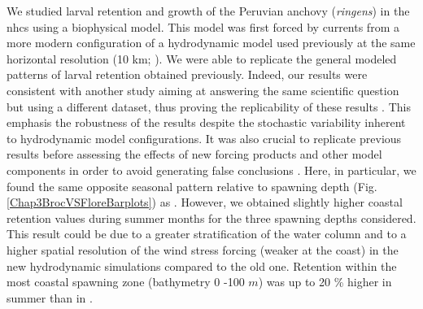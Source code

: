 We studied larval retention and growth of the Peruvian anchovy (\textit{\gls{ringens}}) in the \acrshort{nhcs} using a biophysical model. This model was first forced by currents from a more modern configuration of a hydrodynamic model used previously at the same horizontal resolution (10 km; \cite{BrocLett2008}). We were able to replicate the general modeled patterns of larval retention obtained previously. Indeed, our results were consistent with another study aiming at answering the same scientific question but using a different dataset, thus proving the replicability of these results \citep{NAP25303}. This emphasis the robustness of the results despite the stochastic variability inherent to hydrodynamic model configurations. It was also crucial to replicate previous results before assessing the effects of new forcing products and other model components in order to avoid generating false conclusions \citep{Bake2016}. Here, in particular, we found the same opposite seasonal pattern relative to spawning depth (Fig. \ref{Chap3BrocVSFloreBarplots}) as \cite{BrocLett2008}. However, we obtained slightly higher coastal retention values during summer months for the three spawning depths considered. This result could be due to a greater stratification of the water column and to a higher spatial resolution of the wind stress forcing (weaker at the coast) in the new hydrodynamic simulations compared to the old one. Retention within the most coastal spawning zone (bathymetry 0 -100 $m$) was up to 20 \% higher in summer than in \cite{BrocLett2008}.\\

